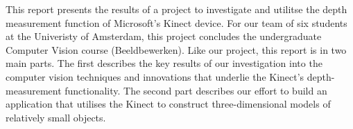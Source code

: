 This report presents the results of a project to investigate and utilitse the
depth measurement function of Microsoft's Kinect device. For our team of six
students at the Univeristy of Amsterdam, this project concludes the
undergraduate Computer Vision course (Beeldbewerken). Like our project, this
report is in two main parts.  The first describes the key results of our
investigation into the computer vision techniques and innovations that underlie
the Kinect's depth-measurement functionality. The second part describes our
effort to build an application that utilises the Kinect to construct
three-dimensional models of relatively small objects. 

